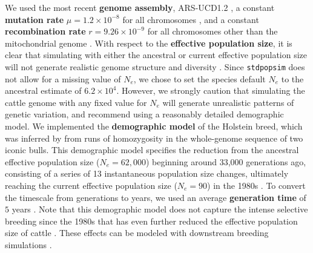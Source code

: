 \documentclass[hidelinks]{article}
\newcommand{\stdpopsim}{\texttt{stdpopsim}\xspace}
\begin{document}
We used the most recent \textbf{genome assembly}, ARS-UCD1.2
\citep{Rosen2020}, a constant \textbf{mutation rate} \(\mu=1.2\times 10^{-8}\) for all chromosomes \citep{Harland2017}, 
and a constant \textbf{recombination rate} \(r=9.26 \times 10^{-9}\) for all chromosomes other than the mitochondrial genome \citep{Ma2015}.
%
With respect to the \textbf{effective population size}, it is clear that simulating with either 
the ancestral or current effective population size will not generate realistic genome structure and diversity \citep{MacLeod2013,Rosen2020}.
%
Since \stdpopsim  does not allow for a missing value of $N_e$,
we chose to set the species default $N_e$ to the ancestral estimate of $6.2\times 10^4$.
However, we strongly caution that
simulating the cattle genome with any fixed value for $N_e$ will generate unrealistic patterns of genetic variation,
and recommend using a reasonably detailed demographic model.
%
We implemented the \textbf{demographic model} of the Holstein breed, which was
inferred by \cite{MacLeod2013} from runs of homozygosity in the whole-genome sequence of two iconic bulls.
%
This demographic model specifies the reduction from the ancestral effective population size ($N_e=62,000$) beginning around 33,000 generations ago, consisting of a series of 13 instantaneous population size changes, ultimately reaching the current effective population size ($N_e=90$) in the 1980s \citep[taken from Supplementary Table S1 in][]{MacLeod2013}.
%
To convert the timescale from generations to years, we used an average \textbf{generation time} of $5$ years \citep{MacLeod2013}.
%
Note that this demographic model does not capture the intense selective breeding since the 1980s that has even further reduced the effective population size of cattle \citep{MacLeod2013, VanRaden2020, Makanjouloa2020}. These effects can be modeled with
downstream breeding simulations \citep[e.g.,][]{Gaynor2020}.
%
\end{document}
